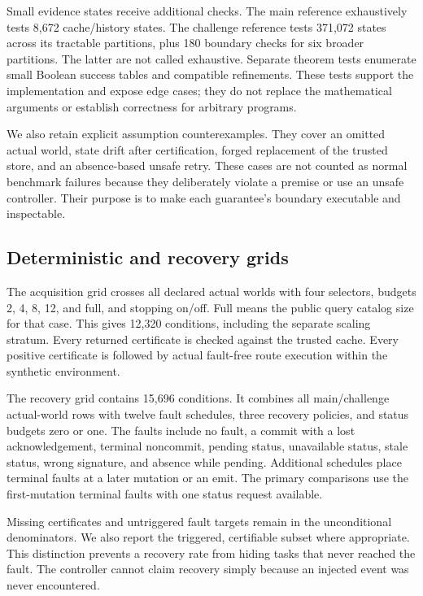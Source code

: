 \documentclass[conference]{IEEEtran}
\begin{document}
Small evidence states receive additional checks. The main reference exhaustively tests 8,672 cache/history states. The challenge reference tests 371,072 states across its tractable partitions, plus 180 boundary checks for six broader partitions. The latter are not called exhaustive. Separate theorem tests enumerate small Boolean success tables and compatible refinements. These tests support the implementation and expose edge cases; they do not replace the mathematical arguments or establish correctness for arbitrary programs.

We also retain explicit assumption counterexamples. They cover an omitted actual world, state drift after certification, forged replacement of the trusted store, and an absence-based unsafe retry. These cases are not counted as normal benchmark failures because they deliberately violate a premise or use an unsafe controller. Their purpose is to make each guarantee's boundary executable and inspectable.

\subsection{Deterministic and recovery grids}
The acquisition grid crosses all declared actual worlds with four selectors, budgets 2, 4, 8, 12, and full, and stopping on/off. Full means the public query catalog size for that case. This gives 12,320 conditions, including the separate scaling stratum. Every returned certificate is checked against the trusted cache. Every positive certificate is followed by actual fault-free route execution within the synthetic environment.

The recovery grid contains 15,696 conditions. It combines all main/challenge actual-world rows with twelve fault schedules, three recovery policies, and status budgets zero or one. The faults include no fault, a commit with a lost acknowledgement, terminal noncommit, pending status, unavailable status, stale status, wrong signature, and absence while pending. Additional schedules place terminal faults at a later mutation or an emit. The primary comparisons use the first-mutation terminal faults with one status request available.

Missing certificates and untriggered fault targets remain in the unconditional denominators. We also report the triggered, certifiable subset where appropriate. This distinction prevents a recovery rate from hiding tasks that never reached the fault. The controller cannot claim recovery simply because an injected event was never encountered.
\end{document}
